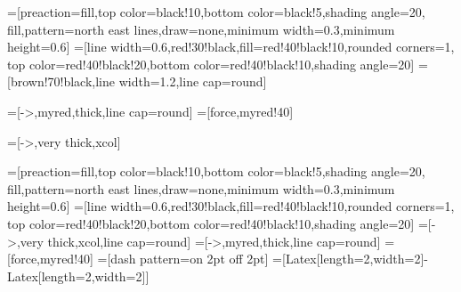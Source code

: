 \usepackage{graphicx}
\usepackage{float}
\usepackage{sidecap}
\usepackage{amsmath}
\usepackage{pgfplots}   %
\pgfplotsset{width=7cm,compat=1.9}
\usepackage{booktabs}
\usepackage{amssymb}





\usepackage{tikz}
\usetikzlibrary{patterns, shapes.geometric}
\usepackage{physics}
\usepackage{ifthen}
\usepackage{tikz}
\usepackage[outline]{contour} %
\usetikzlibrary{calc} %
\usetikzlibrary{angles,quotes} %
\usetikzlibrary{patterns}
\tikzset{>=latex} %
\contourlength{1.2pt}

=[preaction={fill,top color=black!10,bottom color=black!5,shading angle=20},
                    fill,pattern=north east lines,draw=none,minimum width=0.3,minimum height=0.6]
=[line width=0.6,red!30!black,fill=red!40!black!10,rounded corners=1,
                  top color=red!40!black!20,bottom color=red!40!black!10,shading angle=20]
=[brown!70!black,line width=1.2,line cap=round] %

=[->,myred,thick,line cap=round]
=[force,myred!40]
\newcommand{\vbF}{\vb{F}}




\usepackage{amsmath}
\usepackage{tikz}
\usepackage{physics}
\usepackage[outline]{contour} %
\usetikzlibrary{angles,quotes} %
\contourlength{1.2pt}

\tikzset{>=latex} %
\usepackage{xcolor}
=[->,very thick,xcol]


\usetikzlibrary{calc} %
\usetikzlibrary{arrows.meta}
\usetikzlibrary{patterns}
\usetikzlibrary{angles,quotes} %
\tikzset{>=latex} %

=[preaction={fill,top color=black!10,bottom color=black!5,shading angle=20},
                    fill,pattern=north east lines,draw=none,minimum width=0.3,minimum height=0.6]
=[line width=0.6,red!30!black,fill=red!40!black!10,rounded corners=1,
                  top color=red!40!black!20,bottom color=red!40!black!10,shading angle=20]
=[->,very thick,xcol,line cap=round]
=[->,myred,thick,line cap=round]
=[force,myred!40]
=[dash pattern=on 2pt off 2pt]
=[{Latex[length=2,width=2]}-{Latex[length=2,width=2]}]
\def\tick#1#2{\draw[thick] (#1) ++ (#2:0.1) --++ (#2-180:0.2)} %


